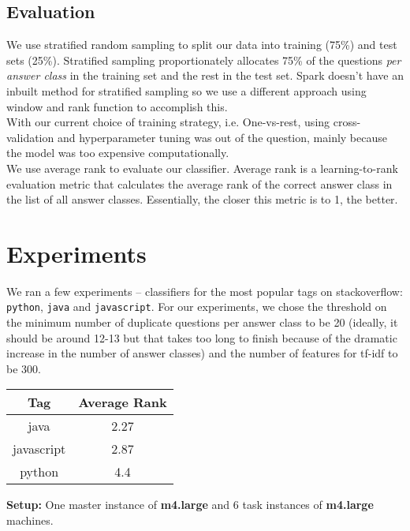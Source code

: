 \documentclass{article}
\begin{document}
\subsection{Evaluation}
We use stratified random sampling to split our data into training (75\%) and test sets (25\%). Stratified sampling proportionately allocates 75\% of the questions \textit{per answer class} in the training set and the rest in the test set. Spark doesn't have an inbuilt method for stratified sampling so we use a different approach using window and rank function to accomplish this.\\

With our current choice of training strategy, i.e. One-vs-rest, using cross-validation and hyperparameter tuning was out of the question, mainly because the model was too expensive computationally.\\

We use average rank to evaluate our classifier. Average rank is a learning-to-rank evaluation metric that calculates the average rank of the correct answer class in the list of all answer classes. Essentially, the closer this metric is to 1, the better.

\section{Experiments}
We ran a few experiments -- classifiers for the most popular tags  on stackoverflow: \texttt{python}, \texttt{java} and \texttt{javascript}. For our experiments, we chose the threshold on the minimum number of duplicate questions per answer class to be 20 (ideally, it should be around 12-13 but that takes too long to finish because of the dramatic increase in the number of answer classes) and the number of features for tf-idf to be 300.\\

\begin{center}
	\begin{tabular}
		{|c c|} 
		\hline
		Tag & Average Rank\\ 
		\hline\hline
		java & 2.27 \\ 
		\hline
		javascript & 2.87 \\
		\hline
		python & 4.4 \\
		\hline
	\end{tabular}
\end{center}


\textbf{Setup:} One master instance of \textbf{m4.large} and 6 task instances of \textbf{m4.large} machines.\\
\end{document}
